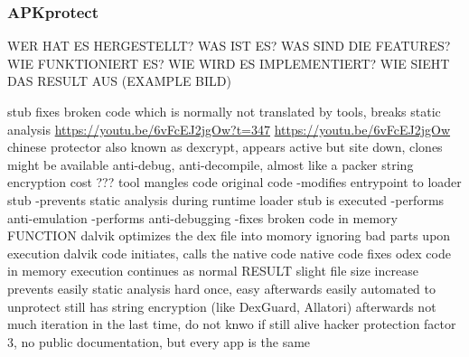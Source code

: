 \subsubsection{APKprotect} \label{subsubsection:counter-reengineering-propack-apkprotect}

WER HAT ES HERGESTELLT? WAS IST ES? WAS SIND DIE FEATURES? WIE FUNKTIONIERT ES? WIE WIRD ES IMPLEMENTIERT? WIE SIEHT DAS RESULT AUS (EXAMPLE BILD)\newline

stub fixes broken code which is normally not translated by tools, breaks static analysis \newline
\url{https://youtu.be/6vFcEJ2jgOw?t=347}\newline
\url{https://youtu.be/6vFcEJ2jgOw}\newline
chinese protector\newline
also known as dexcrypt, appears active but site down, clones might be available\newline
anti-debug, anti-decompile, almost like a packer\newline
string encryption\newline
cost ???\newline
tool mangles code original code\newline
-modifies entrypoint to loader stub\newline
-prevents static analysis\newline
during runtime loader stub is executed\newline
-performs anti-emulation\newline
-performs anti-debugging\newline
-fixes broken code in memory\newline
FUNCTION\newline
dalvik optimizes the dex file into momory ignoring bad parts\newline
upon execution dalvik code initiates, calls the native code\newline
native code fixes odex code in memory\newline
execution continues as normal\newline
RESULT\newline
slight file size increase\newline
prevents easily static analysis\newline
hard once, easy afterwards\newline
easily automated to unprotect\newline
still has string encryption (like DexGuard, Allatori) afterwards\newline
not much iteration in the last time, do not knwo if still alive\newline
hacker protection factor 3, no public documentation, but every app is the same\newline
